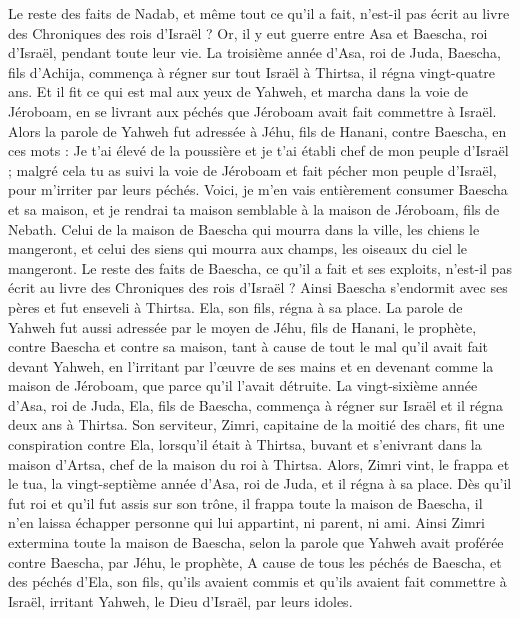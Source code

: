 \begin{multicols}{2}
Le reste des faits de Nadab, et même tout ce qu'il a fait, n'est-il pas écrit au livre des Chroniques des rois d'Israël ?
Or, il y eut guerre entre Asa et Baescha, roi d'Israël, pendant toute leur vie.
La troisième année d'Asa, roi de Juda, Baescha, fils d'Achija, commença à régner sur tout Israël à Thirtsa, il régna vingt-quatre ans.
Et il fit ce qui est mal aux yeux de Yahweh, et marcha dans la voie de Jéroboam, en se livrant aux péchés que Jéroboam avait fait commettre à Israël.
\VerseOne{}Alors la parole de Yahweh fut adressée à Jéhu, fils de Hanani, contre Baescha, en ces mots :
Je t'ai élevé de la poussière et je t'ai établi chef de mon peuple d'Israël ; malgré cela tu as suivi la voie de Jéroboam et fait pécher mon peuple d'Israël, pour m'irriter par leurs péchés.
Voici, je m'en vais entièrement consumer Baescha et sa maison, et je rendrai ta maison semblable à la maison de Jéroboam, fils de Nebath.
Celui de la maison de Baescha qui mourra dans la ville, les chiens le mangeront, et celui des siens qui mourra aux champs, les oiseaux du ciel le mangeront.
Le reste des faits de Baescha, ce qu'il a fait et ses exploits, n'est-il pas écrit au livre des Chroniques des rois d'Israël ?
Ainsi Baescha s'endormit avec ses pères et fut enseveli à Thirtsa. Ela, son fils, régna à sa place.
La parole de Yahweh fut aussi adressée par le moyen de Jéhu, fils de Hanani, le prophète, contre Baescha et contre sa maison, tant à cause de tout le mal qu'il avait fait devant Yahweh, en l'irritant par l'œuvre de ses mains et en devenant comme la maison de Jéroboam, que parce qu'il l'avait détruite.
La vingt-sixième année d'Asa, roi de Juda, Ela, fils de Baescha, commença à régner sur Israël et il régna deux ans à Thirtsa.
Son serviteur, Zimri, capitaine de la moitié des chars, fit une conspiration contre Ela, lorsqu'il était à Thirtsa, buvant et s'enivrant dans la maison d'Artsa, chef de la maison du roi à Thirtsa.
Alors, Zimri vint, le frappa et le tua, la vingt-septième année d'Asa, roi de Juda, et il régna à sa place.
Dès qu’il fut roi et qu'il fut assis sur son trône, il frappa toute la maison de Baescha, il n'en laissa échapper personne qui lui appartint, ni parent, ni ami.
Ainsi Zimri extermina toute la maison de Baescha, selon la parole que Yahweh avait proférée contre Baescha, par Jéhu, le prophète,
A cause de tous les péchés de Baescha, et des péchés d'Ela, son fils, qu’ils avaient commis et qu’ils avaient fait commettre à Israël, irritant Yahweh, le Dieu d'Israël, par leurs idoles.

\end{multicols}
